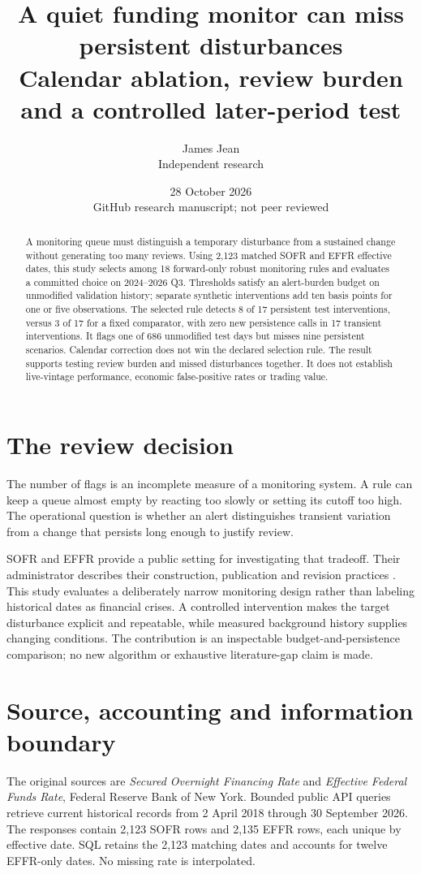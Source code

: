 \documentclass[11pt]{article}
\title{A quiet funding monitor can miss persistent disturbances\\\large Calendar ablation, review burden and a controlled later-period test}
\author{James Jean\\Independent research}
\date{28 October 2026\\GitHub research manuscript; not peer reviewed}
\begin{document}
\maketitle
\begin{abstract}
A monitoring queue must distinguish a temporary disturbance from a sustained change without generating too many reviews. Using 2,123 matched SOFR and EFFR effective dates, this study selects among 18 forward-only robust monitoring rules and evaluates a committed choice on 2024--2026 Q3. Thresholds satisfy an alert-burden budget on unmodified validation history; separate synthetic interventions add ten basis points for one or five observations. The selected rule detects 8 of 17 persistent test interventions, versus 3 of 17 for a fixed comparator, with zero new persistence calls in 17 transient interventions. It flags one of 686 unmodified test days but misses nine persistent scenarios. Calendar correction does not win the declared selection rule. The result supports testing review burden and missed disturbances together. It does not establish live-vintage performance, economic false-positive rates or trading value.
\end{abstract}

\section{The review decision}
The number of flags is an incomplete measure of a monitoring system. A rule can keep a queue almost empty by reacting too slowly or setting its cutoff too high. The operational question is whether an alert distinguishes transient variation from a change that persists long enough to justify review.

SOFR and EFFR provide a public setting for investigating that tradeoff. Their administrator describes their construction, publication and revision practices \cite{rates}. This study evaluates a deliberately narrow monitoring design rather than labeling historical dates as financial crises. A controlled intervention makes the target disturbance explicit and repeatable, while measured background history supplies changing conditions. The contribution is an inspectable budget-and-persistence comparison; no new algorithm or exhaustive literature-gap claim is made.

\section{Source, accounting and information boundary}
The original sources are \emph{Secured Overnight Financing Rate} and \emph{Effective Federal Funds Rate}, Federal Reserve Bank of New York. Bounded public API queries retrieve current historical records from 2 April 2018 through 30 September 2026. The responses contain 2,123 SOFR rows and 2,135 EFFR rows, each unique by effective date. SQL retains the 2,123 matching dates and accounts for twelve EFFR-only dates. No missing rate is interpolated.
\end{document}
